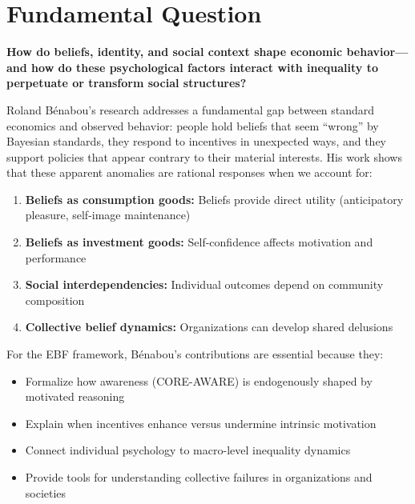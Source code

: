 \section{Fundamental Question}
\label{sec:rb-fundamental}

\begin{tcolorbox}[colback=red!5!white,colframe=red!75!black,title=Fundamental Question]
\textbf{How do beliefs, identity, and social context shape economic behavior---and how do these psychological factors interact with inequality to perpetuate or transform social structures?}
\end{tcolorbox}

Roland Bénabou's research addresses a fundamental gap between standard economics and observed behavior: people hold beliefs that seem ``wrong'' by Bayesian standards, they respond to incentives in unexpected ways, and they support policies that appear contrary to their material interests. His work shows that these apparent anomalies are rational responses when we account for:

\begin{enumerate}
    \item \textbf{Beliefs as consumption goods:} Beliefs provide direct utility (anticipatory pleasure, self-image maintenance)
    \item \textbf{Beliefs as investment goods:} Self-confidence affects motivation and performance
    \item \textbf{Social interdependencies:} Individual outcomes depend on community composition
    \item \textbf{Collective belief dynamics:} Organizations can develop shared delusions
\end{enumerate}

For the EBF framework, Bénabou's contributions are essential because they:
\begin{itemize}
    \item Formalize how awareness (CORE-AWARE) is endogenously shaped by motivated reasoning
    \item Explain when incentives enhance versus undermine intrinsic motivation
    \item Connect individual psychology to macro-level inequality dynamics
    \item Provide tools for understanding collective failures in organizations and societies
\end{itemize}

